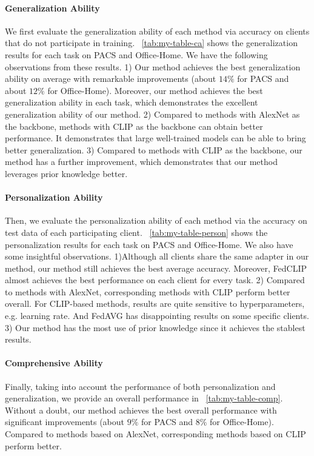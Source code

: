 \documentclass[11pt]{article}
\newcommand{\method}{FedCLIP\xspace}
\newcommand{\wjdd}[1]{\todo[linecolor=cyan,backgroundcolor=cyan!25,bordercolor=cyan,size=\scriptsize]{(WJD): #1}}
\begin{document}
\paragraph{Generalization Ability}

We first evaluate the generalization ability of each method via accuracy on clients that do not participate in training.
\tablename~\ref{tab:my-table-ca} shows the generalization results for each task on PACS and Office-Home.
We have the following observations from these results.
1) Our method achieves the best generalization ability on average with remarkable improvements (about $14\%$ for PACS and about $12\%$ for Office-Home).
Moreover, our method achieves the best generalization ability in each task, which demonstrates the excellent generalization ability of our method.
2) Compared to methods with AlexNet as the backbone, methods with CLIP as the backbone can obtain better performance.
It demonstrates that large well-trained models can be able to bring better generalization.
3) Compared to methods with CLIP as the backbone, our method has a further improvement, which demonstrates that our method leverages prior knowledge better.%

\paragraph{Personalization Ability}

Then, we evaluate the personalization ability of each method via the accuracy on test data of each participating client.
\tablename~\ref{tab:my-table-person} shows the personalization results for each task on PACS and Office-Home.
We also have some insightful observations.
1)Although all clients share the same adapter in our method, our method still achieves the best average accuracy.
Moreover, \method almost achieves the best performance on each client for every task.
2) Compared to methods with AlexNet, corresponding methods with CLIP perform better overall.
For CLIP-based methods, results are quite sensitive to hyperparameters, e.g. learning rate.
And FedAVG has disappointing results on some specific clients.
3) Our method has the most use of prior knowledge since it achieves the stablest results.

\paragraph{Comprehensive Ability}

Finally, taking into account the performance of both personalization and generalization, we provide an overall performance in \tablename~\ref{tab:my-table-comp}.
Without a doubt, our method achieves the best overall performance with significant improvements (about $9\%$ for PACS and $8\%$ for Office-Home).
Compared to methods based on AlexNet, corresponding methods based on CLIP perform better.
\end{document}
